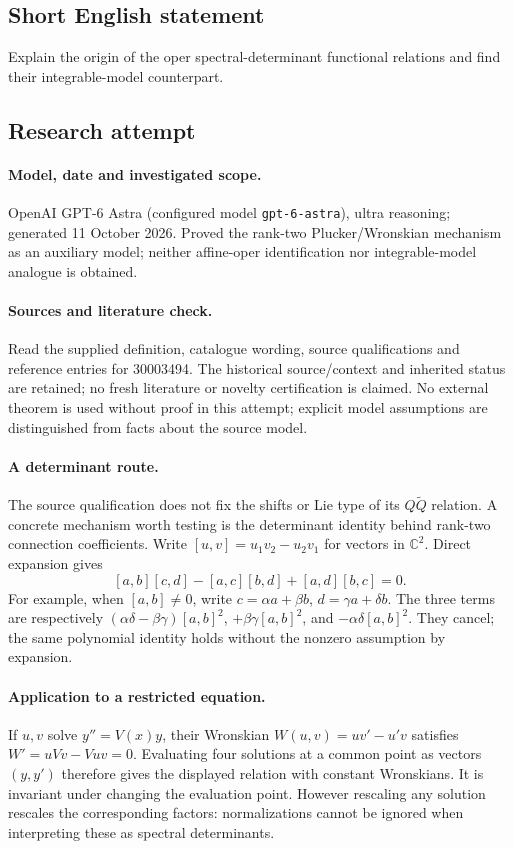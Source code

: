 \documentclass[11pt]{article}
\begin{document}
\subsection{Short English statement}
Explain the origin of the oper spectral-determinant functional relations and find their integrable-model counterpart.
\subsection{Research attempt}
\paragraph{Model, date and investigated scope.}
OpenAI GPT-6 Astra (configured model \texttt{gpt-6-astra}), ultra reasoning; generated 11 October 2026. Proved the rank-two Plucker/Wronskian mechanism as an auxiliary model; neither affine-oper identification nor integrable-model analogue is obtained.

\paragraph{Sources and literature check.}
Read the supplied definition, catalogue wording, source qualifications and reference entries for 30003494. The historical source/context and inherited status are retained; no fresh literature or novelty certification is claimed. No external theorem is used without proof in this attempt; explicit model assumptions are distinguished from facts about the source model.

\paragraph{A determinant route.} The source qualification does not fix the shifts or Lie type of its \(Q\widetilde Q\) relation. A concrete mechanism worth testing is the determinant identity behind rank-two connection coefficients. Write \([u,v]=u_1v_2-u_2v_1\) for vectors in \(\mathbb C^2\). Direct expansion gives
\[
 [a,b][c,d]-[a,c][b,d]+[a,d][b,c]=0.
\]
For example, when \([a,b]\ne0\), write \(c=\alpha a+\beta b\), \(d=\gamma a+\delta b\). The three terms are respectively \((\alpha\delta-\beta\gamma)[a,b]^2\), \(+\beta\gamma[a,b]^2\), and \(-\alpha\delta[a,b]^2\). They cancel; the same polynomial identity holds without the nonzero assumption by expansion.
\paragraph{Application to a restricted equation.} If \(u,v\) solve \(y''=V(x)y\), their Wronskian \(W(u,v)=uv'-u'v\) satisfies \(W'=uVv-Vuv=0\). Evaluating four solutions at a common point as vectors \((y,y')\) therefore gives the displayed relation with constant Wronskians. It is invariant under changing the evaluation point. However rescaling any solution rescales the corresponding factors: normalizations cannot be ignored when interpreting these as spectral determinants.
\end{document}

